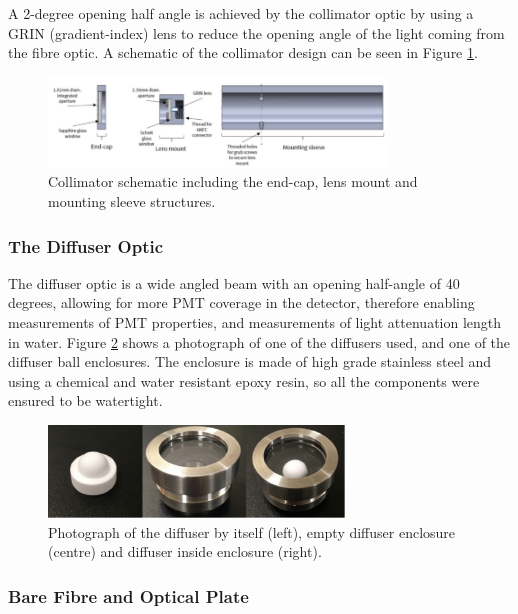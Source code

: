A 2-degree opening half angle is achieved by the collimator optic by using a GRIN (gradient-index) lens \cite{grin_lens} to reduce the opening angle of the light coming from the fibre optic. A schematic of the collimator design can be seen in Figure \ref{fig:collimator_schematic}. 

\begin{figure}
    \centering
    \includegraphics[width=0.8\textwidth]{Figures/collimator_schematic.png}
    \caption{Collimator schematic including the end-cap, lens mount and mounting sleeve structures.}
    \label{fig:collimator_schematic}
\end{figure}


\subsubsection{The Diffuser Optic}

The diffuser optic is a wide angled beam with an opening half-angle of 40 degrees, allowing for more PMT coverage in the detector, therefore enabling measurements of PMT properties, and measurements of light attenuation length in water. Figure \ref{fig:diffuser_photo} shows a photograph of one of the diffusers used, and one of the diffuser ball enclosures. The enclosure is made of high grade stainless steel and using a chemical and water resistant epoxy resin, so all the components were ensured to be watertight. 

\begin{figure}
    \centering
    \includegraphics[width=0.7\textwidth]{Figures/diffuser_photo.png}
    \caption{Photograph of the diffuser by itself (left), empty diffuser enclosure (centre) and diffuser inside enclosure (right).}
    \label{fig:diffuser_photo}
\end{figure} 

\subsubsection{Bare Fibre and Optical Plate}


